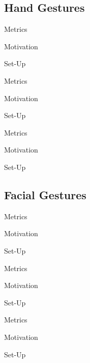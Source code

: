 \documentclass{beamer}
\begin{document}
\subsection{Hand Gestures}
%
\begin{frame}{Metrics}
\end{frame}
%
\begin{frame}{Motivation}
\end{frame}
%
\begin{frame}{Set-Up}
\end{frame}
%
%
\begin{frame}{Metrics}
\end{frame}
%
\begin{frame}{Motivation}
\end{frame}
%
\begin{frame}{Set-Up}
\end{frame}
%
%
\begin{frame}{Metrics}
\end{frame}
%
\begin{frame}{Motivation}
\end{frame}
%
\begin{frame}{Set-Up}
\end{frame}
%
\subsection{Facial Gestures}
%
\begin{frame}{Metrics}
\end{frame}
%
\begin{frame}{Motivation}
\end{frame}
%
\begin{frame}{Set-Up}
\end{frame}
%
%
\begin{frame}{Metrics}
\end{frame}
%
\begin{frame}{Motivation}
\end{frame}
%
\begin{frame}{Set-Up}
\end{frame}
%
%
\begin{frame}{Metrics}
\end{frame}
%
\begin{frame}{Motivation}
\end{frame}
%
\begin{frame}{Set-Up}
\end{frame}
%
\end{document}
